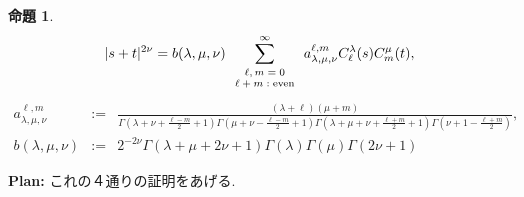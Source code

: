 \documentclass[pdf,notes]{beamer}
\newcommand{\tmop}[1]{\ensuremath{\operatorname{#1}}}
\newtheorem{prop}{命題}
\newtheorem{remark}{注}
\begin{document}
\begin{frame}
	\begin{prop}\label{prop:exp-st-gg}
		\begin{equation}
			| s + t |^{2 \nu} =b(\lambda,\mu,\nu) \sum_{\mbox{\scriptsize $\begin{array}[]{c}
			\ell, m = 0 \\ \ell + m : \tmop{even}
		\end{array}$}}^{\infty} a_{\lambda,\mu,\nu}^{\ell,m} C_\ell^{\lambda} (s) C_m^{\mu} (t),
			\label{eqn:exp-st-gg}
		\end{equation}
		{\scriptsize
			\begin{equation*}
				\begin{array}{rcl}
	a_{\lambda,\mu,\nu}^{\ell,m}&:=&\frac{ (\lambda + \ell) (\mu + m)   }{\Gamma \left( \lambda + \nu + \frac{\ell -
	  m}{2} + 1 \right)  \Gamma \left( \mu + \nu -
	  \frac{\ell - m}{2} + 1 \right)\Gamma \left( \lambda + \mu + \nu + \frac{\ell +
	  m}{2} + 1 \right)\Gamma\left(  \nu+1-\frac{\ell+m}{2}\right)},\\[0.4cm]
	  b(\lambda,\mu,\nu)&:=&2^{-2\nu}\Gamma (\lambda + \mu + 2 \nu + 1){\Gamma (\lambda)
	  \Gamma (\mu)\Gamma \left( 2\nu +
	1 \right)}
			\end{array}
			\end{equation*}
	}
	\end{prop}
	{\bf Plan:} これの４通りの証明をあげる.
\end{frame}
\end{document}
